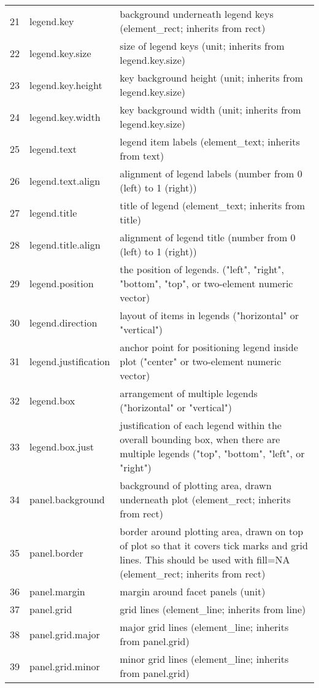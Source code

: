 \begin{table}[ht]
\begin{tabular}{rll}
  21 & legend.key & background underneath legend keys (element\_rect; inherits from rect) \\ 
  22 & legend.key.size & size of legend keys (unit; inherits from legend.key.size) \\ 
  23 & legend.key.height & key background height (unit; inherits from legend.key.size) \\ 
  24 & legend.key.width & key background width (unit; inherits from legend.key.size) \\ 
  25 & legend.text & legend item labels (element\_text; inherits from text) \\ 
  26 & legend.text.align & alignment of legend labels (number from 0 (left) to 1 (right)) \\ 
  27 & legend.title & title of legend (element\_text; inherits from title) \\ 
  28 & legend.title.align & alignment of legend title (number from 0 (left) to 1 (right)) \\ 
  29 & legend.position & the position of legends. ("left", "right", "bottom", "top", or two-element numeric vector) \\ 
  30 & legend.direction & layout of items in legends ("horizontal" or "vertical") \\ 
  31 & legend.justification & anchor point for positioning legend inside plot ("center" or two-element numeric vector) \\ 
  32 & legend.box & arrangement of multiple legends ("horizontal" or "vertical") \\ 
  33 & legend.box.just & justification of each legend within the overall bounding box, when there are multiple legends ("top", "bottom", "left", or "right") \\ 
  34 & panel.background & background of plotting area, drawn underneath plot (element\_rect; inherits from rect) \\ 
  35 & panel.border & border around plotting area, drawn on top of plot so that it covers tick marks and grid lines. This should be used with fill=NA (element\_rect; inherits from rect) \\ 
  36 & panel.margin & margin around facet panels (unit) \\ 
  37 & panel.grid & grid lines (element\_line; inherits from line) \\ 
  38 & panel.grid.major & major grid lines (element\_line; inherits from panel.grid) \\ 
  39 & panel.grid.minor & minor grid lines (element\_line; inherits from panel.grid) \\ 

\end{tabular}
\end{table}
